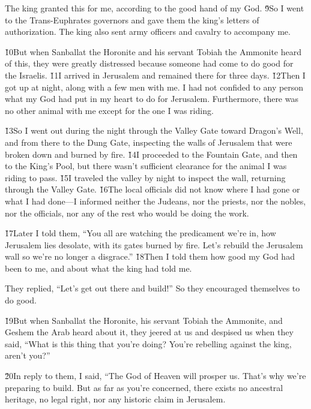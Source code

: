 The king granted this for me, according to the good hand of my God. \v{9}So I went to the Trans-Euphrates governors and gave them the king's letters of authorization. The king also sent army officers and cavalry to accompany me.

\v{10}But when Sanballat the Horonite and his servant Tobiah the Ammonite heard of this, they were greatly distressed because someone had come to do good for the Israelis. \v{11}I arrived in Jerusalem and remained there for three days. \v{12}Then I got up at night, along with a few men with me. I had not confided to any person what my God had put in my heart to do for Jerusalem. Furthermore, there was no other animal with me except for the one I was riding.

\v{13}So I went out during the night through the Valley Gate toward Dragon's Well, and from there to the Dung Gate, inspecting the walls of Jerusalem that were broken down and burned by fire. \v{14}I proceeded to the Fountain Gate, and then to the King's Pool, but there wasn't sufficient clearance for the animal I was riding to pass. \v{15}I traveled the valley by night to inspect the wall, returning through the Valley Gate. \v{16}The local officials did not know where I had gone or what I had done---I informed neither the Judeans, nor the priests, nor the nobles, nor the officials, nor any of the rest who would be doing the work.

\v{17}Later I told them, ``You all are watching the predicament we're in, how Jerusalem lies desolate, with its gates burned by fire. Let's rebuild the Jerusalem wall so we're no longer a disgrace.'' \v{18}Then I told them how good my God had been to me, and about what the king had told me.

They replied, ``Let's get out there and build!'' So they encouraged themselves to do good.

\v{19}But when Sanballat the Horonite, his servant Tobiah the Ammonite, and Geshem the Arab heard about it, they jeered at us and despised us when they said, ``What is this thing that you're doing? You're rebelling against the king, aren't you?''

\v{20}In reply to them, I said, ``The God of Heaven will prosper us. That's why we're preparing to build. But as far as you're concerned, there exists no ancestral heritage, no legal right, nor any historic claim in Jerusalem.

